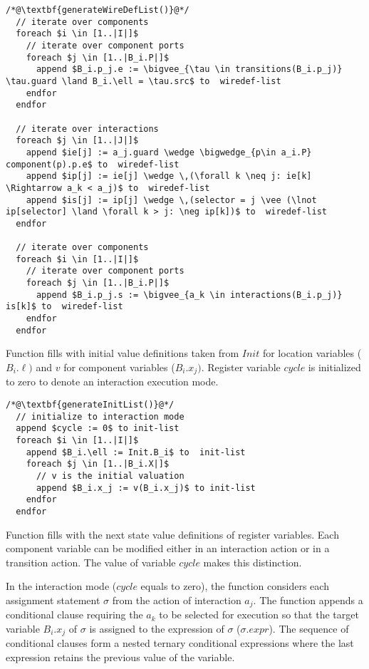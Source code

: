  
\begin{lstlisting}
/*@\textbf{generateWireDefList()}@*/
  // iterate over components
  foreach $i \in [1..|I|]$ 
    // iterate over component ports
    foreach $j \in [1..|B_i.P|]$ 
      append $B_i.p_j.e := \bigvee_{\tau \in transitions(B_i.p_j)} \tau.guard \land B_i.\ell = \tau.src$ to  wiredef-list 
    endfor
  endfor
  
  // iterate over interactions
  foreach $j \in [1..|J|]$ 
    append $ie[j] := a_j.guard \wedge \bigwedge_{p\in a_i.P} component(p).p.e$ to  wiredef-list 
    append $ip[j] := ie[j] \wedge \,(\forall k \neq j: ie[k] \Rightarrow a_k < a_j)$ to  wiredef-list 
    append $is[j] := ip[j] \wedge \,(selector = j \vee (\lnot ip[selector] \land \forall k > j: \neg ip[k])$ to  wiredef-list 
  endfor
  
  // iterate over components
  foreach $i \in [1..|I|]$ 
    // iterate over component ports
    foreach $j \in [1..|B_i.P|]$ 
      append $B_i.p_j.s := \bigvee_{a_k \in interactions(B_i.p_j)} is[k]$ to  wiredef-list 
    endfor
  endfor
\end{lstlisting}

Function  fills  with initial value definitions taken from $Init$ for location variables ($B_i.\ell)$ and $v$ for component variables ($B_i.x_j)$. Register variable $cycle$ is initialized to zero to denote an interaction execution mode. 

\begin{lstlisting}
/*@\textbf{generateInitList()}@*/
  // initialize to interaction mode
  append $cycle := 0$ to init-list 
  foreach $i \in [1..|I|]$
    append $B_i.\ell := Init.B_i$ to  init-list 
    foreach $j \in [1..|B_i.X|]$
      // v is the initial valuation
      append $B_i.x_j := v(B_i.x_j)$ to init-list  
    endfor
  endfor
\end{lstlisting}

Function  fills  with the next state value definitions of register variables. Each component variable can be modified either in an interaction action or in a transition action. The value of variable $cycle$ makes this distinction. 

In the interaction mode ($cycle$ equals to zero), the function considers each assignment statement $\sigma$ from the action of interaction $a_j$. The function appends a conditional clause requiring the $a_k$ to be selected for execution so that the target variable $B_i.x_j$ of $\sigma$ is assigned to the expression of $\sigma$ ($\sigma.expr$). The sequence of conditional clauses form a nested ternary conditional expressions where the last expression retains the previous value of the variable. 

